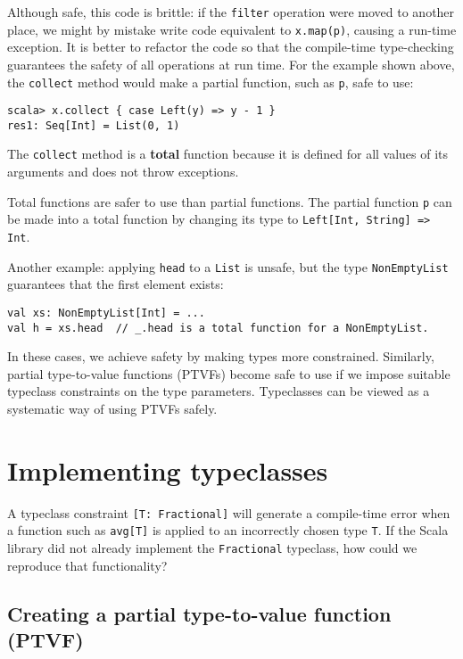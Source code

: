 Although safe, this code is brittle: if the \lstinline!filter! operation
were moved to another place, we might by mistake write code equivalent
to \lstinline!x.map(p)!, causing a run-time exception. It is better
to refactor the code so that the compile-time type-checking guarantees
the safety of all operations at run time. For the example shown above,
the \lstinline!collect! method would make a partial function, such
as \lstinline!p!, safe to use:
\begin{lstlisting}
scala> x.collect { case Left(y) => y - 1 }
res1: Seq[Int] = List(0, 1)
\end{lstlisting}
The \lstinline!collect! method is a \textbf{total}
function because it is defined for all values of its arguments and
does not throw exceptions. 

Total functions are safer to use than partial functions. The partial
function \lstinline!p! can be made into a total function by changing
its type to \lstinline!Left[Int, String] => Int!.

Another example: applying \lstinline!head! to a \lstinline!List!
is unsafe, but the type \lstinline!NonEmptyList! guarantees that
the first element exists:
\begin{lstlisting}
val xs: NonEmptyList[Int] = ...
val h = xs.head  // _.head is a total function for a NonEmptyList.
\end{lstlisting}

In these cases, we achieve safety by making types more constrained.
Similarly, partial type-to-value functions (PTVFs) become safe to
use if we impose suitable typeclass constraints on the type parameters.
Typeclasses can be viewed as a systematic way of using PTVFs safely.

\section{Implementing typeclasses}

A typeclass constraint \lstinline![T: Fractional]! will generate
a compile-time error when a function such as \lstinline!avg[T]! is
applied to an incorrectly chosen type \lstinline!T!. If the Scala
library did not already implement the \lstinline!Fractional! typeclass,
how could we reproduce that functionality?

\subsection{Creating a partial type-to-value function (PTVF)}

